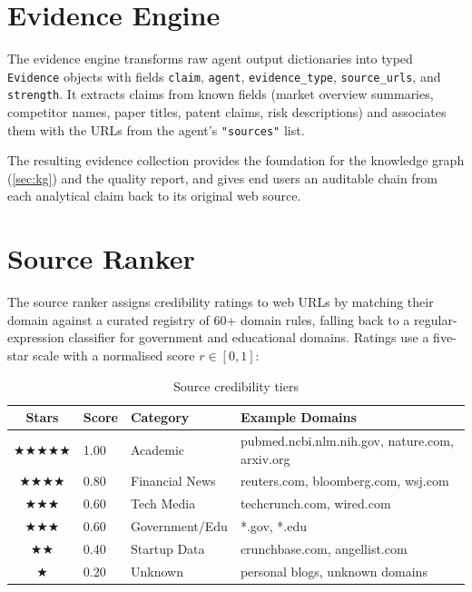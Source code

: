\documentclass[12pt,a4paper,oneside]{book}
\begin{document}
\section{Evidence Engine}

The evidence engine transforms raw agent output dictionaries into typed \texttt{Evidence} objects with fields \texttt{claim}, \texttt{agent}, \texttt{evidence\_type}, \texttt{source\_urls}, and \texttt{strength}. It extracts claims from known fields (market overview summaries, competitor names, paper titles, patent claims, risk descriptions) and associates them with the URLs from the agent's \texttt{"sources"} list.

The resulting evidence collection provides the foundation for the knowledge graph (\cref{sec:kg}) and the quality report, and gives end users an auditable chain from each analytical claim back to its original web source.

\section{Source Ranker}
\label{sec:source_ranker}

The source ranker assigns credibility ratings to web URLs by matching their domain against a curated registry of 60+ domain rules, falling back to a regular-expression classifier for government and educational domains. Ratings use a five-star scale with a normalised score $r \in [0, 1]$:

\begin{table}[H]
\centering
\caption{Source credibility tiers}
\label{tab:source_tiers}
\begin{tabular}{clll}
\toprule
\textbf{Stars} & \textbf{Score} & \textbf{Category} & \textbf{Example Domains} \\
\midrule
$\bigstar\bigstar\bigstar\bigstar\bigstar$ & 1.00 & Academic         & pubmed.ncbi.nlm.nih.gov, nature.com, arxiv.org \\
$\bigstar\bigstar\bigstar\bigstar$         & 0.80 & Financial News   & reuters.com, bloomberg.com, wsj.com \\
$\bigstar\bigstar\bigstar$                & 0.60 & Tech Media       & techcrunch.com, wired.com \\
$\bigstar\bigstar\bigstar$                & 0.60 & Government/Edu   & *.gov, *.edu \\
$\bigstar\bigstar$                        & 0.40 & Startup Data     & crunchbase.com, angellist.com \\
$\bigstar$                               & 0.20 & Unknown          & personal blogs, unknown domains \\
\bottomrule
\end{tabular}
\end{table}
\end{document}
